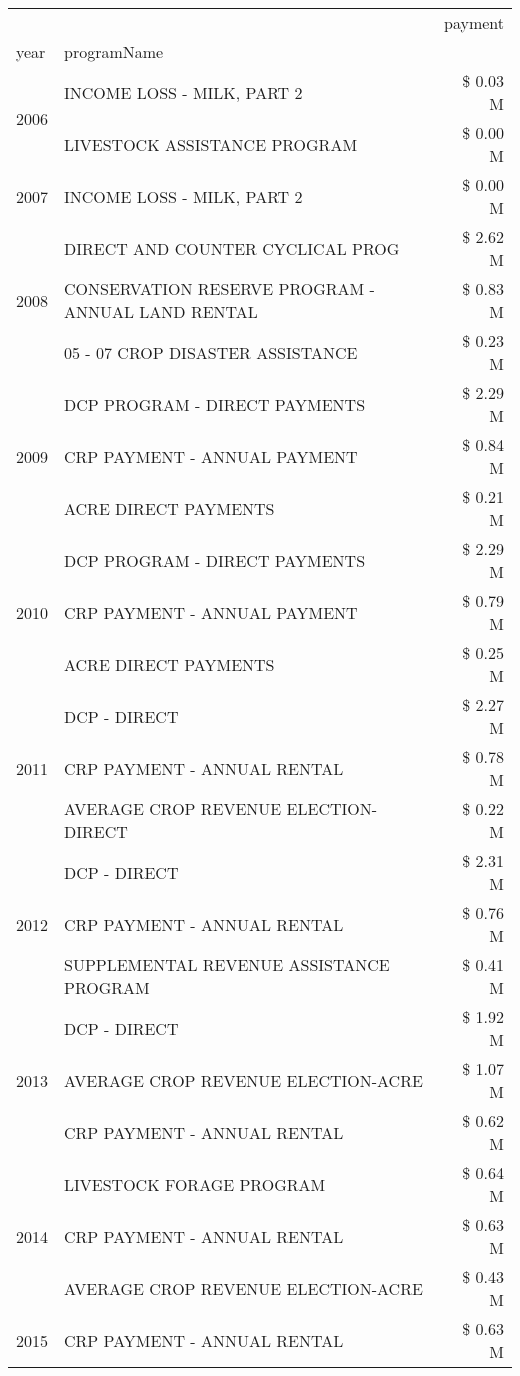 \begin{tabular}{llr}
\toprule
 &  & payment \\
year & programName &  \\
\midrule
\multirow[t]{2}{*}{2006} & INCOME LOSS - MILK, PART 2 & \$ 0.03 M \\
 & LIVESTOCK ASSISTANCE PROGRAM & \$ 0.00 M \\
\cline{1-3}
2007 & INCOME LOSS - MILK, PART 2 & \$ 0.00 M \\
\cline{1-3}
\multirow[t]{3}{*}{2008} & DIRECT AND COUNTER CYCLICAL PROG & \$ 2.62 M \\
 & CONSERVATION RESERVE PROGRAM - ANNUAL LAND RENTAL & \$ 0.83 M \\
 & 05 - 07 CROP DISASTER ASSISTANCE & \$ 0.23 M \\
\cline{1-3}
\multirow[t]{3}{*}{2009} & DCP PROGRAM - DIRECT PAYMENTS & \$ 2.29 M \\
 & CRP PAYMENT - ANNUAL PAYMENT & \$ 0.84 M \\
 & ACRE DIRECT PAYMENTS & \$ 0.21 M \\
\cline{1-3}
\multirow[t]{3}{*}{2010} & DCP PROGRAM - DIRECT PAYMENTS & \$ 2.29 M \\
 & CRP PAYMENT - ANNUAL PAYMENT & \$ 0.79 M \\
 & ACRE DIRECT PAYMENTS & \$ 0.25 M \\
\cline{1-3}
\multirow[t]{3}{*}{2011} & DCP - DIRECT & \$ 2.27 M \\
 & CRP PAYMENT - ANNUAL RENTAL & \$ 0.78 M \\
 & AVERAGE CROP REVENUE ELECTION-DIRECT & \$ 0.22 M \\
\cline{1-3}
\multirow[t]{3}{*}{2012} & DCP - DIRECT & \$ 2.31 M \\
 & CRP PAYMENT - ANNUAL RENTAL & \$ 0.76 M \\
 & SUPPLEMENTAL REVENUE ASSISTANCE PROGRAM & \$ 0.41 M \\
\cline{1-3}
\multirow[t]{3}{*}{2013} & DCP - DIRECT & \$ 1.92 M \\
 & AVERAGE CROP REVENUE ELECTION-ACRE & \$ 1.07 M \\
 & CRP PAYMENT - ANNUAL RENTAL & \$ 0.62 M \\
\cline{1-3}
\multirow[t]{3}{*}{2014} & LIVESTOCK FORAGE PROGRAM & \$ 0.64 M \\
 & CRP PAYMENT - ANNUAL RENTAL & \$ 0.63 M \\
 & AVERAGE CROP REVENUE ELECTION-ACRE & \$ 0.43 M \\
\cline{1-3}
\multirow[t]{3}{*}{2015} & CRP PAYMENT - ANNUAL RENTAL & \$ 0.63 M \\

\end{tabular}

